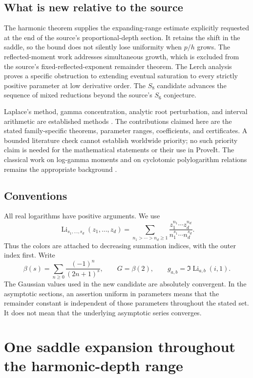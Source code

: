 \documentclass[11pt,letterpaper]{article}
\numberwithin{equation}{section}
\theoremstyle{plain}
\theoremstyle{definition}
\theoremstyle{remark}
\DeclareMathOperator{\Li}{Li}
\begin{document}
\subsection{What is new relative to the source}
The harmonic theorem supplies the expanding-range estimate explicitly
requested at the end of the source's proportional-depth section. It
retains the shift in the saddle, so the bound does not silently lose
uniformity when \(p/h\) grows. The reflected-moment work addresses
simultaneous growth, which is excluded from the source's
fixed-reflected-exponent remainder theorem. The Lerch analysis proves a
specific obstruction to extending eventual saturation to every
strictly positive parameter at low derivative order. The \(S_8\)
candidate advances the sequence of mixed reductions beyond the source's
\(S_6\) conjecture.

Laplace's method, gamma concentration, analytic root perturbation, and
interval arithmetic are established methods \cite{DLMF23,TemmeUniform}.
The contributions claimed here are the stated family-specific theorems,
parameter ranges, coefficients, and certificates. A bounded literature
check cannot establish worldwide priority; no such priority claim is
needed for the mathematical statements or their use in ProveIt.
The classical work on log-gamma moments and on cyclotomic polylogarithm
relations remains the appropriate background
\cite{ACEMKM,Zhao2008,Coffey}.

\subsection{Conventions}
All real logarithms have positive arguments. We use
\[
 \Li_{s_1,\ldots,s_d}(z_1,\ldots,z_d)
 =\sum_{n_1>\cdots>n_d\geq1}
   \frac{z_1^{n_1}\cdots z_d^{n_d}}
        {n_1^{s_1}\cdots n_d^{s_d}}.
\]
Thus the colors are attached to decreasing summation indices, with
the outer index first. Write
\[
 \beta(s)=\sum_{n\geq0}\frac{(-1)^n}{(2n+1)^s},\qquad
 G=\beta(2),\qquad
 g_{a,b}=\Im\Li_{a,b}(i,1).
\]
The Gaussian values used in the new candidate are absolutely convergent.
In the asymptotic sections, an assertion uniform in parameters means
that the remainder constant is independent of those parameters
throughout the stated set. It does not mean that the underlying
asymptotic series converges.


\section{One saddle expansion throughout the harmonic-depth range}
\label{cont26:sec:uniform}
\end{document}
